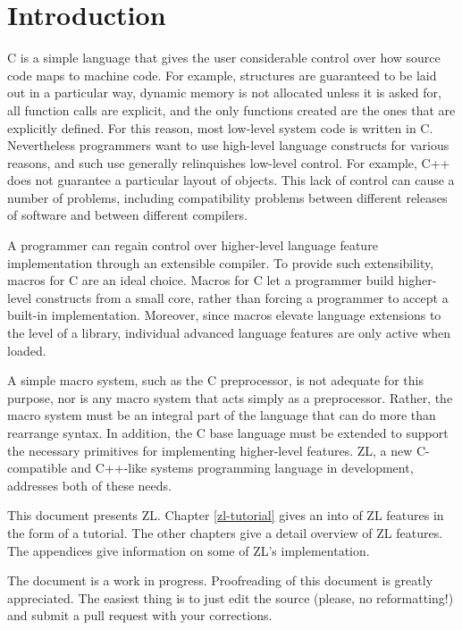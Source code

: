 \chapter{Introduction}
\label{intro}

C is a simple language that gives the user considerable control
over how source code maps to machine code.  For example, structures are
guaranteed to be laid out in a particular way, dynamic memory is not
allocated unless it is asked for, all function calls are explicit, and
the only functions created are the ones that are explicitly defined.
For this reason, most low-level system code is written in C.  Nevertheless
programmers want to use high-level language constructs for various
reasons, and such use generally relinquishes low-level control.
For example, C++ does not guarantee a particular layout of objects.
This lack of control can cause a number of problems, including
compatibility problems between different releases of software and
between different compilers.

A programmer can regain control over higher-level language feature
implementation through an extensible compiler.  To provide such
extensibility, macros for C are an ideal choice.  Macros for C let a
programmer build higher-level constructs from a small core, rather
than forcing a programmer to accept a built-in
implementation. Moreover, since macros elevate language extensions to
the level of a library, individual advanced language features are only
active when loaded.

A simple macro system, such as the C preprocessor, is not adequate for
this purpose, nor is any macro system that acts simply as a
preprocessor.  Rather, the macro system must be an integral part of
the language that can do more than rearrange syntax.  In addition, the
C base language must be extended to support the necessary primitives
for implementing higher-level features.  ZL, a new C-compatible and
C++-like systems programming language in development, addresses both
of these needs.

This document presents ZL.  Chapter \ref{zl-tutorial} gives an into of
ZL features in the form of a tutorial.  The other chapters give a
detail overview of ZL features.  The appendices give information on
some of ZL's implementation.

The document is a work in progress.  Proofreading of this document is
greatly appreciated.  The easiest thing is to just edit the source
(please, no reformatting!) and submit a pull request with
your corrections.

